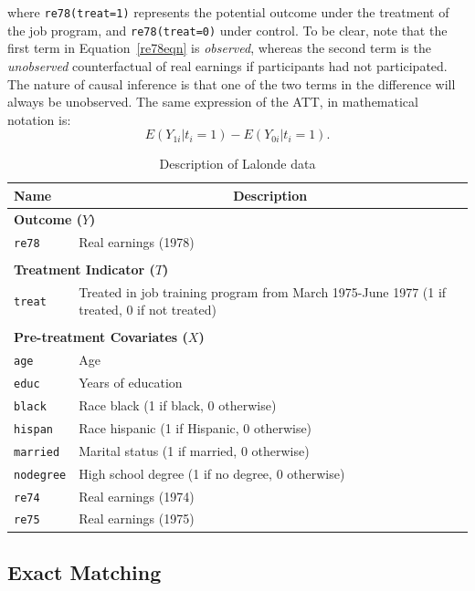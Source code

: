 \documentclass[oneside,letterpaper,titlepage]{article}
\begin{document}
\noindent where \texttt{re78(treat=1)} represents the potential
outcome under the treatment of the job program, and
\texttt{re78(treat=0)} under control.  To be clear, note that the
first term in Equation~\ref{re78eqn} is \emph{observed}, whereas the
second term is the \emph{unobserved} counterfactual of real earnings
if participants had not participated.  The nature of causal inference
is that one of the two terms in the difference will always be
unobserved.  The same expression of the ATT, in mathematical notation
is:
\begin{equation}
  E(Y_{1i} | t_i=1 ) - E(Y_{0i} | t_i=1).
\end{equation}
\begin{table}[h]
\centering
\begin{tabular}{lp{3in}}
  \hline 
  \multicolumn{1}{l}{Name} & \multicolumn{1}{c}{Description} \\
  \hline
  \multicolumn{2}{l}{\textbf{Outcome ($Y$)}} \\ 
  \texttt{re78} & Real earnings (1978) \\\\
  \multicolumn{2}{l}{\textbf{Treatment Indicator ($T$)}} \\
  \texttt{treat} & Treated in job training program from March 1975-June
  1977 (1 if treated, 0 if not treated)
  \\ \\
  \multicolumn{2}{l}{\textbf{Pre-treatment Covariates ($X$)}} \\
  \texttt{age} & Age\\
  \texttt{educ} & Years of education \\
  \texttt{black} & Race black (1 if black, 0 otherwise) \\
  \texttt{hispan} & Race hispanic  (1 if Hispanic, 0 otherwise) \\
  \texttt{married} & Marital status (1 if married, 0 otherwise) \\
  \texttt{nodegree} & High school degree (1 if no degree, 0 otherwise)\\
  \texttt{re74} & Real earnings (1974) \\
  \texttt{re75} & Real earnings (1975) \\ 
  \hline
\end{tabular}\label{lalonde}
\caption{Description of Lalonde data \label{dwvars}}
\end{table}

\subsection{Exact Matching \label{exactm}}
\end{document}
